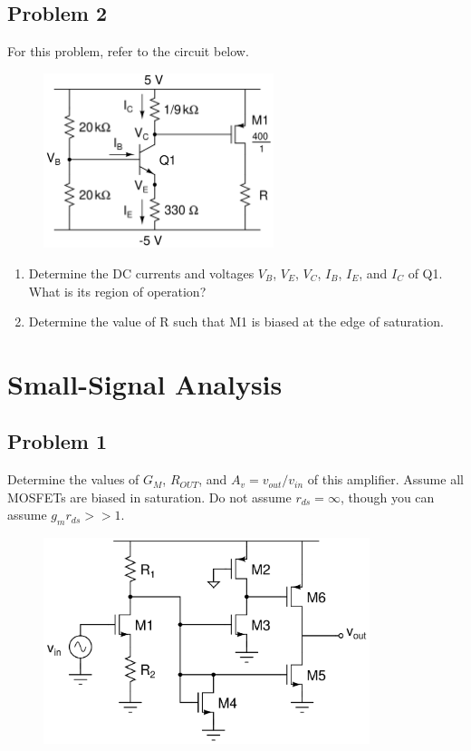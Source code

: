 \documentclass{article}
\begin{document}
\subsection*{Problem 2}
For this problem, refer to the circuit below.
\begin{figure}[!htb]
\begin{center}
    \includegraphics[width=0.6\textwidth]{figures/cc_dc1 (1).png}
\end{center}
\end{figure}
\begin{enumerate}[label=\textbf{(\alph*)}]
    \item Determine the DC currents and voltages $V_B$, $V_E$, $V_C$, $I_B$, $I_E$, and $I_C$ of Q1.  What is its region of operation?
    \item Determine the value of R such that M1 is biased at the edge of saturation.
\end{enumerate}
\newpage
\section*{Small-Signal Analysis}
\subsection*{Problem 1}
Determine the values of $G_M$, $R_{OUT}$, and $A_v = v_{out}/v_{in}$ of this amplifier.  Assume all MOSFETs are biased in saturation.  Do not assume $r_{ds} = \infty$, though you can assume $g_mr_{ds} >> 1$.
\begin{figure}[!h]
\begin{center}
    \includegraphics[width=0.85\textwidth]{figures/cc_amp1.png}
\end{center}
\end{figure}
\newpage
\end{document}
